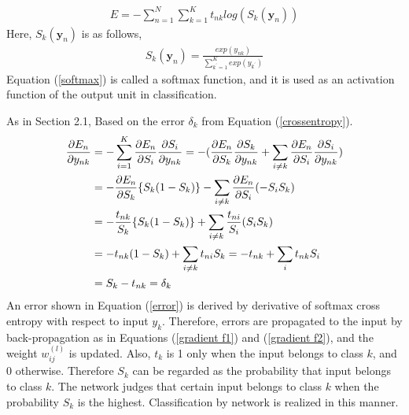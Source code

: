 \documentclass[a4paper,12pt]{article}
\begin{document}
\begin{align} \label{crossentropy}
E=-\sum_{n=1}^N \sum_{k=1}^K{t_{nk}log(S_k({\bm y}_n))}
\end{align}
Here, $S_k({\bm y}_n)$ is as follows,
\begin{align} \label{softmax}
S_k({\bm y}_n) = \frac{exp(y_{nk})}{\sum_{k^\prime=1}^K{exp(y_{k^\prime})}}
\end{align}
Equation (\ref{softmax}) is called a softmax function, and it is used as an activation function of the output unit in classification. \par
As in Section 2.1, Based on the error $\delta_k$ from Equation (\ref{crossentropy}).
\begin{align}
\frac{\partial E_n}{\partial y_{nk}} &=-\sum_{i=1}^K{\frac{\partial E_n}{\partial S_i} \frac{\partial S_i}{\partial y_{nk}}}=-(\frac{\partial E_n}{\partial S_k}\frac{\partial S_k}{\partial y_{nk}}+\sum_{i \neq k}{\frac{\partial E_n}{\partial S_i} \frac{\partial S_i}{\partial y_{nk}}}) \notag \\
&=-\frac{\partial E_n}{\partial S_k} \{S_k(1-S_k)\}-\sum_{i \neq k}{\frac{\partial E_n}{\partial S_i}(-S_i S_k)} \notag \\
&=-\frac{t_{nk}}{S_k}\{S_k(1-S_k)\}+\sum_{i \neq k}{\frac{t_{ni}}{S_i}(S_i S_k)} \notag \\
&=-t_{nk}(1-S_k)+\sum_{i \neq k}{t_{ni} S_k}=-t_{nk}+\sum_i{t_{nk} S_i} \notag \\
&= S_k - t_{nk}=\delta_k
\end{align}
An error shown in Equation (\ref{error}) is derived by derivative of softmax cross entropy with respect to input $y_k$.
Therefore, errors are propagated to the input by back-propagation as in Equations (\ref{gradient f1}) and (\ref{gradient f2}), and the weight $w^{(l)}_{ij}$ is updated. Also, $t_k$ is 1 only when the input belongs to class $k$, and 0 otherwise. Therefore $S_k$ can be regarded as the probability that input belongs to class $k$. 
The network judges that certain input belongs to class $k$ when the probability $S_k$ is the highest.
Classification by network is realized in this manner.



\end{document}
